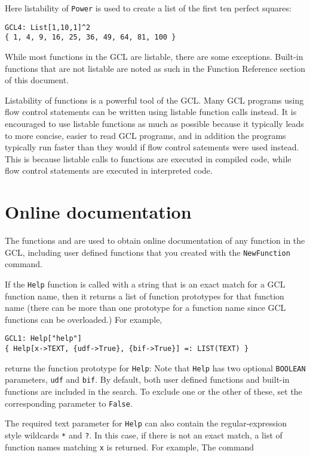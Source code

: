 Here listability of \verb+Power+ is used to create a list of the first
ten perfect squares:

\begin{verbatim}
GCL4: List[1,10,1]^2
{ 1, 4, 9, 16, 25, 36, 49, 64, 81, 100 }
\end{verbatim}

While most functions in the GCL are listable, there are some
exceptions.  Built-in functions that are not listable are noted as
such in the Function Reference section of this document.

Listability of functions is a powerful tool of the GCL. Many GCL
programs using flow control statements can be written using listable
function calls instead.  It is encouraged to use listable functions as
much as possible because it typically leads to more concise, easier to
read GCL programs, and in addition the programs typically run
faster than they would if flow control satements were used instead.
This is because listable calls to functions are executed in compiled
code, while flow control statements are executed in interpreted code.

\section{Online documentation}

The functions  and  are used to obtain online
documentation of any function in the GCL, including user defined
functions that you created with the \verb+NewFunction+ command. 

If the \verb+Help+ function is called with a string that is an exact
match for a GCL function name, then it returns a list of function
prototypes for that function name (there can be more than one
prototype for a function name since GCL functions can be overloaded.)
For example,

\begin{verbatim}
GCL1: Help["help"]
{ Help[x->TEXT, {udf->True}, {bif->True}] =: LIST(TEXT) }
\end{verbatim}

\noindent
returns the function prototype for \verb+Help+: Note that \verb+Help+
has two optional \verb+BOOLEAN+ parameters, \verb+udf+ and \verb+bif+.
By default, both user defined functions and built-in functions are
included in the search.  To exclude one or the other of these, set the
corresponding parameter to \verb+False+.

The required text parameter for \verb+Help+ can also contain the
regular-expression style wildcards \verb+*+ and \verb+?+.  In this
case, if there is not an exact match, a list of function names
matching \verb+x+ is returned.  For example, The command 

